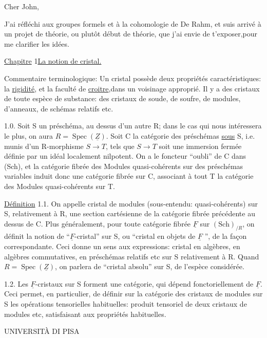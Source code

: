 
Cher John,

J'ai réfléchi aux groupes formels et à la cohomologie de De Rahm, et suis arrivé à un projet de théorie, ou plutôt  début de théorie, que j'ai envie de t'exposer,pour me clarifier les idées.

\uline{Chapitre} 1\qquad\uline{La notion de cristal.}

Commentaire terminologique: Un cristal possède deux propriétés caractéristiques: la \uline{rigidité}, et la faculté de \uline{croitre},dans un voisinage approprié. Il y a des cristaux de toute espèce de substance: des cristaux de soude, de soufre, de modules, d'anneaux, de schémas relatifs etc.

1.0. Soit S un préschéma, au dessus d'un autre R; dans le cas qui nous intéressera le plus, on aura $R=\operatorname{Spec}(\underline Z)$. Soit C la catégorie des préschémas  \uline{sous} S, \inserted{(}i.e. munis d'un R-morphisme $S\to T$,\inserted{)} tels que $S\to T$ soit une immersion fermée définie par un idéal localement nilpotent. On a le foncteur ``oubli'' de C dans (Sch), et la catégorie fibrée des Modules quasi-cohérents sur des préschémas variables induit donc une catégorie fibrée sur C, associant à tout T la catégorie des Modules quasi-cohérents sur T.

\uline{Définition} 1.1. On appelle cristal de modules (sous-entendu: quasi-cohérents) sur S, relativement à R, une section cartésienne de la catégorie fibrée précédente au dessus de C. Plus généralement, pour toute catégorie fibrée $\underline F$ sur $(\mathrm{Sch})_{/R}$, on définit la notion de ``$\underline F$-cristal'' sur S, ou ``cristal en objets de $\underline F$ '', de la façon correspondante. Ceci donne un sens aux expressions: cristal en algèbres, en algèbres commutatives, en préschémas relatifs etc\inserted{,} sur S relativement à R. Quand $R=\operatorname{Spec}(\underline Z)$, on parlera de ``cristal absolu'' sur S, de l'espèce considérée.

1.2. Les $\underline F$-cristaux sur S forment une catégorie, qui dépend fonctoriellement de $\underline F$. Ceci permet, en particulier, de définir sur la catégorie des cristaux de modules sur S les opérations tensorielles habituelles: produit tensoriel de deux cristaux de modules etc, satisfaisant aux propriétés habituelles.


UNIVERSITÀ DI PISA

